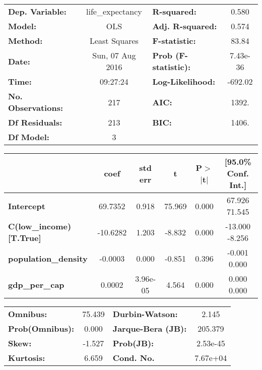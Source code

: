 \begin{center}
\begin{tabular}{lclc}
\toprule
\textbf{Dep. Variable:}        & life_expectancy  & \textbf{  R-squared:         } &     0.580   \\
\textbf{Model:}                &       OLS        & \textbf{  Adj. R-squared:    } &     0.574   \\
\textbf{Method:}               &  Least Squares   & \textbf{  F-statistic:       } &     83.84   \\
\textbf{Date:}                 & Sun, 07 Aug 2016 & \textbf{  Prob (F-statistic):} &  7.43e-36   \\
\textbf{Time:}                 &     09:27:24     & \textbf{  Log-Likelihood:    } &   -692.02   \\
\textbf{No. Observations:}     &         217      & \textbf{  AIC:               } &     1392.   \\
\textbf{Df Residuals:}         &         213      & \textbf{  BIC:               } &     1406.   \\
\textbf{Df Model:}             &           3      & \textbf{                     } &             \\
\bottomrule
\end{tabular}
\begin{tabular}{lccccc}
                               & \textbf{coef} & \textbf{std err} & \textbf{t} & \textbf{P$>$$|$t$|$} & \textbf{[95.0\% Conf. Int.]}  \\
\midrule
\textbf{Intercept}             &      69.7352  &        0.918     &    75.969  &         0.000        &        67.926    71.545       \\
\textbf{C(low_income)[T.True]} &     -10.6282  &        1.203     &    -8.832  &         0.000        &       -13.000    -8.256       \\
\textbf{population_density}    &      -0.0003  &        0.000     &    -0.851  &         0.396        &        -0.001     0.000       \\
\textbf{gdp_per_cap}           &       0.0002  &     3.96e-05     &     4.564  &         0.000        &         0.000     0.000       \\
\bottomrule
\end{tabular}
\begin{tabular}{lclc}
\textbf{Omnibus:}       & 75.439 & \textbf{  Durbin-Watson:     } &    2.145  \\
\textbf{Prob(Omnibus):} &  0.000 & \textbf{  Jarque-Bera (JB):  } &  205.379  \\
\textbf{Skew:}          & -1.527 & \textbf{  Prob(JB):          } & 2.53e-45  \\
\textbf{Kurtosis:}      &  6.659 & \textbf{  Cond. No.          } & 7.67e+04  \\
\bottomrule
\end{tabular}
\end{center}